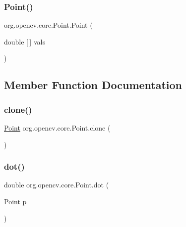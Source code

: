 \subsubsection{\texorpdfstring{Point()}{Point()}\hspace{0.1cm}{\footnotesize\ttfamily [3/3]}}
{\footnotesize\ttfamily org.\+opencv.\+core.\+Point.\+Point (\begin{DoxyParamCaption}\item[{double \mbox{[}$\,$\mbox{]}}]{vals }\end{DoxyParamCaption})}



\subsection{Member Function Documentation}
\mbox{\label{classorg_1_1opencv_1_1core_1_1_point_ab639c60b6eeb3510655fe352cca84205}} 
\subsubsection{\texorpdfstring{clone()}{clone()}}
{\footnotesize\ttfamily \mbox{\hyperlink{classorg_1_1opencv_1_1core_1_1_point}{Point}} org.\+opencv.\+core.\+Point.\+clone (\begin{DoxyParamCaption}{ }\end{DoxyParamCaption})}

\mbox{\label{classorg_1_1opencv_1_1core_1_1_point_ac048a9b96927ce34a9e23decbebb066c}} 
\subsubsection{\texorpdfstring{dot()}{dot()}}
{\footnotesize\ttfamily double org.\+opencv.\+core.\+Point.\+dot (\begin{DoxyParamCaption}\item[{\mbox{\hyperlink{classorg_1_1opencv_1_1core_1_1_point}{Point}}}]{p }\end{DoxyParamCaption})}


